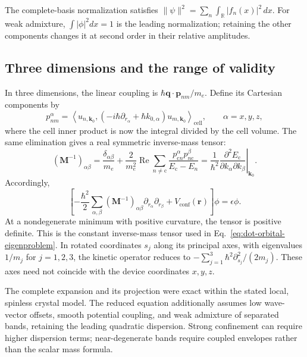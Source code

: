 The complete-basis normalization satisfies
$\|\psi\|^2=\sum_n\int_{\mathbb R}|f_n(x)|^2\,dx$.
For weak admixture, $\int|\phi|^2dx=1$ is the leading normalization;
retaining the other components changes it at second order
in their relative amplitudes.

\subsection{Three dimensions and the range of validity}
\label{sec:em-three-dimensions}

In three dimensions, the linear coupling is
$\hbar\mathbf q\cdot\mathbf p_{nm}/m_e$. Define its Cartesian
components by
\[
  p_{nm}^{\alpha}=\left\langle u_{n,\mathbf k_0},
       (-i\hbar\partial_{r_\alpha}+\hbar k_{0,\alpha})
                u_{m,\mathbf k_0}\right\rangle_{\mathrm{cell}},
  \qquad \alpha=x,y,z,
\]
where the cell inner product is now the integral divided by
the cell volume. The same elimination gives a real symmetric
inverse-mass tensor:
\begin{equation}
  (\mathbf M^{-1})_{\alpha\beta}
    =\frac{\delta_{\alpha\beta}}{m_e}
      +\frac{2}{m_e^2}\operatorname{Re}
          \sum_{n\ne\mathrm c}
          \frac{p_{\mathrm c n}^{\alpha}p_{n\mathrm c}^{\beta}}
               {E_{\mathrm c}-E_n}
    =\frac1{\hbar^2}
       \left.\frac{\partial^2E_{\mathrm c}}
                    {\partial k_\alpha\partial k_\beta}
       \right|_{\mathbf k_0}.
  \label{eq:em-mass-tensor}
\end{equation}
Accordingly,
\begin{equation}
  \left[-\frac{\hbar^2}{2}\sum_{\alpha,\beta}
         (\mathbf M^{-1})_{\alpha\beta}
              \partial_{r_\alpha}\partial_{r_\beta}
        +V_{\mathrm{conf}}(\mathbf r)\right]\phi
      =\epsilon\phi.
  \label{eq:em-three-dimensional-equation}
\end{equation}
At a nondegenerate minimum with positive curvature, the tensor
is positive definite. This is the constant inverse-mass tensor used
in Eq.~\eqref{eq:dot-orbital-eigenproblem}. In rotated coordinates
$s_j$ along its principal axes, with eigenvalues $1/m_j$ for
$j=1,2,3$, the kinetic operator reduces to
$-\sum_{j=1}^{3}\hbar^2\partial_{s_j}^2/(2m_j)$.
These axes need not coincide with the device coordinates $x,y,z$.

The complete expansion and its projection were exact within
the stated local, spinless crystal model. The reduced equation
additionally assumes low wave-vector offsets, smooth potential
coupling, and weak admixture of separated bands, retaining the
leading quadratic dispersion. Strong confinement can require
higher dispersion terms; near-degenerate bands require coupled
envelopes rather than the scalar mass formula.

